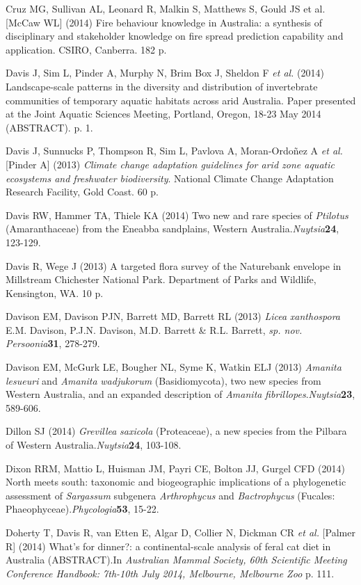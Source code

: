 \documentclass[version=last, paper=a4, DIV=18, usenames, dvipsnames]{scrartcl}
\begin{document}
Cruz MG, Sullivan AL, Leonard R, Malkin S, Matthews S, Gould JS et al. [McCaw WL] (2014) Fire behaviour knowledge in Australia: a synthesis of disciplinary and stakeholder knowledge on fire spread prediction capability and application. CSIRO, Canberra. 182 p.


Davis J, Sim L, Pinder A, Murphy N, Brim Box J, Sheldon F \emph{et al.} (2014) Landscape-scale patterns in the diversity and distribution of invertebrate communities of temporary aquatic habitats across arid Australia. Paper presented at the Joint Aquatic Sciences Meeting, Portland, Oregon, 18-23 May 2014 (ABSTRACT). p. 1.


Davis J, Sunnucks P, Thompson R, Sim L, Pavlova A, Moran-Ordoñez A \emph{et al.} [Pinder A] (2013) \emph{Climate change adaptation guidelines for arid zone aquatic ecosystems and freshwater biodiversity}. National Climate Change Adaptation Research Facility, Gold Coast. 60 p.


Davis RW, Hammer TA, Thiele KA (2014) Two new and rare species of \emph{Ptilotus} (Amaranthaceae) from the Eneabba sandplains, Western Australia.\emph{Nuytsia}\textbf{24}, 123-129.


Davis R, Wege J (2013) A targeted flora survey of the Naturebank envelope in Millstream Chichester National Park. Department of Parks and Wildlife, Kensington, WA. 10 p.


Davison EM, Davison PJN, Barrett MD, Barrett RL (2013) \emph{Licea} \emph{xanthospora} E.M. Davison, P.J.N. Davison, M.D. Barrett \& R.L. Barrett, \emph{sp. nov. Persoonia}\textbf{31}, 278-279.


Davison EM, McGurk LE, Bougher NL, Syme K, Watkin ELJ (2013) \emph{Amanita} \emph{lesueuri} and \emph{Amanita} \emph{wadjukorum} (Basidiomycota), two new species from Western Australia, and an expanded description of \emph{Amanita} \emph{fibrillopes}.\emph{Nuytsia}\textbf{23}, 589-606.


Dillon SJ (2014) \emph{Grevillea} \emph{saxicola} (Proteaceae), a new species from the Pilbara of Western Australia.\emph{Nuytsia}\textbf{24}, 103-108.


Dixon RRM, Mattio L, Huisman JM, Payri CE, Bolton JJ, Gurgel CFD (2014) North meets south: taxonomic and biogeographic implications of a phylogenetic assessment of \emph{Sargassum} subgenera \emph{Arthrophycus} and \emph{Bactrophycus} (Fucales: Phaeophyceae).\emph{Phycologia}\textbf{53}, 15-22.


Doherty T, Davis R, van Etten E, Algar D, Collier N, Dickman CR \emph{et al.} [Palmer R] (2014) What's for dinner?: a continental-scale analysis of feral cat diet in Australia (ABSTRACT).In \emph{Australian Mammal Society, 60th Scientific Meeting Conference Handbook: 7th-10th July 2014, Melbourne, Melbourne Zoo} p. 111.
\end{document}
